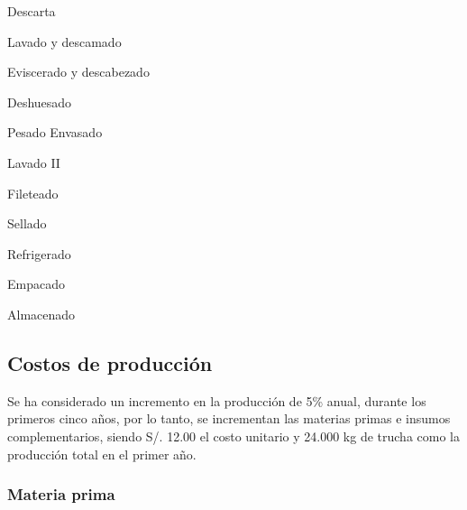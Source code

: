\documentclass[
  stu,
  floatsintext,
  longtable,
  a4paper,
  nolmodern,
  notxfonts,
  notimes,
  12pt,
  colorlinks=true,linkcolor=blue,citecolor=blue,urlcolor=blue]{apa7}
\begin{document}
Descarta

Lavado y descamado

Eviscerado y descabezado

Deshuesado

Pesado Envasado

Lavado II

Fileteado

Sellado

Refrigerado

Empacado

Almacenado

\subsection{Costos de producción}\label{costos-de-producciuxf3n}

Se ha considerado un incremento en la producción de 5\% anual, durante
los primeros cinco años, por lo tanto, se incrementan las materias
primas e insumos complementarios, siendo S/. 12.00 el costo unitario y
24.000 kg de trucha como la producción total en el primer año.

\subsubsection{Materia prima}\label{materia-prima}
\end{document}
